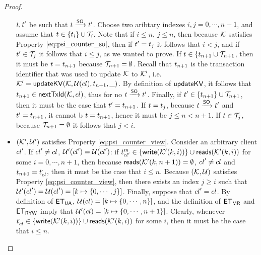 \begin{proof}
\begin{itemize}
$t, t'$ be such that $t \xrightarrow{\mathsf{SO}} t'$. Choose two aribtary indexes $i,j=0,\cdots, n+1$, 
and assume that $t \in \{t_{i}\} \cup \mathcal{T}_{i}$. Note that if $i \leq n$, $j \leq n$, then 
because $\mathcal{K}$ satisfies Property $\eqref{eq:psi_counter_so}$, then 
if $t' = t_{j}$ it follows that $i < j$, and if $t' \in \mathcal{T}_{j}$ it follows that $i \leq j$, as 
we wanted to prove. 
If $t \in \{t_{n+1} \cup \mathcal{T}_{n+1}$, then it must be $t = t_{n+1}$ because 
$\mathcal{T}_{n+1} = \emptyset$. Recall that $t_{n+1}$ is the transaction identifier that was used 
to update $\mathcal{K}$ to $\mathcal{K}'$, i.e. $\mathcal{K}' = \mathsf{updateKV}(\mathcal{K}, \mathcal{U}({cl}), t_{n+1}, \_)$. By 
definition of $\mathsf{updateKV}$, it follows that $t_{n+1} \in \mathsf{nextTxId}(\mathcal{K}, {cl})$, thus for no 
$t \xrightarrow{\mathsf{SO}} t'$. Finally, if $t' \in \{t_{n+1}\} \cup \mathcal{T}_{n+1}$, then 
it must be the case that $t' = t_{n+1}$. If $t = t_{j}$, because 
$t \xrightarrow{\mathsf{SO}} t'$ and $t' = t_{n+1}$, it cannot b $t = t_{n+1}$, 
hence it must be $j \leq n < n+1$. If $t \in \mathcal{T}_{j}$, because $\mathcal{T}_{n+1} = \emptyset$ it 
follows that $j < i$. 
\item $(\mathcal{K}', \mathcal{U}')$ satisfies Property \eqref{eq:psi_counter_view}.  
Consider an arbitrary client ${cl}'$. If ${cl}' \neq {\ensuremath{cl}}$, $\mathcal{U}'({cl}') = \mathcal{U}({cl}')$: if $t_{{cl}'}^{m} \in \{\mathsf{write}(\mathcal{K}'(k, i))\} 
\cup \mathsf{reads}(\mathcal{K}'(k, i))$ for some $i = 0,\cdots, n+1$, then because $\mathsf{reads}(\mathcal{K}'(k, n+1)) = \emptyset$, ${cl}' \neq {\ensuremath{cl}}$ and $t_{n+1} = t_{{cl}}^{\cdot}$, 
then it must be the case that $i \leq n$. Because $(\mathcal{K}, \mathcal{U})$ satisfies Property \eqref{eq:psi_counter_view}, 
then there exists an index $j \geq i$ such that $\mathcal{U}'({cl}') = \mathcal{U}({cl}') = [k \mapsto \{0,\cdots, j\}]$. 
Finally, suppose that ${cl}' = {cl}$. 
By definition of $\mathsf{ET}_{\mathsf{UA}}$, $\mathcal{U}({cl}) = [k \mapsto \{0,\cdots, n\}]$, and the definition 
of $\mathsf{ET}_{\mathsf{MR}}$ and $\mathsf{ET}_{\mathsf{RYW}}$ imply that $\mathcal{U}'({cl}) = [k \mapsto \{0,\cdots, n+1\}]$. 
Clearly, whenever $t_{{cl}}^{\cdot} \in  \{\mathsf{write}(\mathcal{K}'(k, i))\} 
\cup \mathsf{reads}(\mathcal{K}'(k, i))$ for some $i$, then it must be the case that $i \leq n$.
\end{itemize}
\end{proof}


